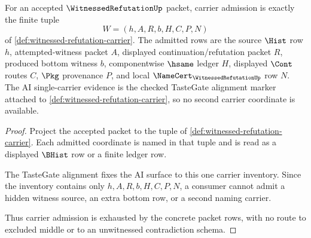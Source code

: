 \begin{theorem}
\label{thm:witnessed-refutation-carrier-admission-obligation}
For an accepted $\WitnessedRefutationUp$ packet, carrier admission is exactly the finite tuple
$$
W=(h,A,R,b,H,C,P,N)
$$
of \autoref{def:witnessed-refutation-carrier}. The admitted rows are the source $\Hist$ row $h$, attempted-witness packet $A$, displayed continuation/refutation packet $R$, produced bottom witness $b$, componentwise $\hsame$ ledger $H$, displayed $\Cont$ routes $C$, $\Pkg$ provenance $P$, and local $\NameCert_{\WitnessedRefutationUp}$ row $N$. The AI single-carrier evidence is the checked TasteGate alignment marker attached to \autoref{def:witnessed-refutation-carrier}, so no second carrier coordinate is available.
\end{theorem}
\begin{proof}
Project the accepted packet to the tuple of \autoref{def:witnessed-refutation-carrier}. Each admitted coordinate is named in that tuple and is read as a displayed $\BHist$ row or a finite ledger row.

The TasteGate alignment fixes the AI surface to this one carrier inventory. Since the inventory contains only $h,A,R,b,H,C,P,N$, a consumer cannot admit a hidden witness source, an extra bottom row, or a second naming carrier.

Thus carrier admission is exhausted by the concrete packet rows, with no route to excluded middle or to an unwitnessed contradiction schema.
\end{proof}

